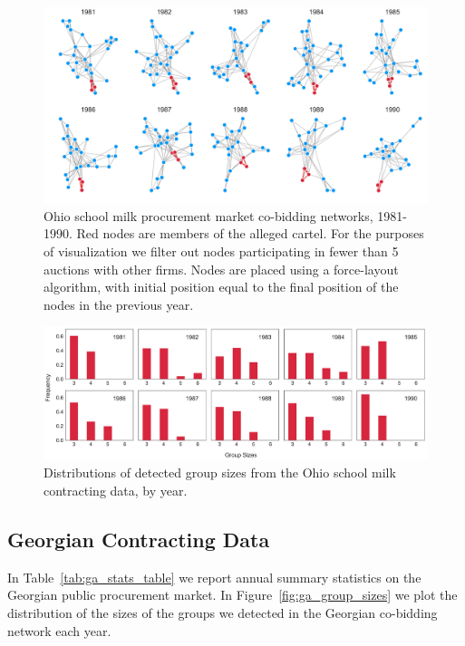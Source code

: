 \begin{figure}
\centering
\includegraphics[width=\textwidth]{images/cartels/ohio_nets.pdf}
\caption[Ohio school milk co-bidding networks by year.]{Ohio school milk procurement market co-bidding networks, 1981-1990. Red nodes are members of the alleged cartel. For the purposes of visualization we filter out nodes participating in fewer than 5 auctions with other firms. Nodes are placed using a force-layout algorithm, with initial position equal to the final position of the nodes in the previous year.}
\label{fig:ohio_nets}
\end{figure}

\begin{figure}
\includegraphics[width=\textwidth]{images/cartels/ohio_group_sizes.pdf}
\caption{Distributions of detected group sizes from the Ohio school milk contracting data, by year.}
\label{fig:oh_group_sizes}
\end{figure}



\subsection{Georgian Contracting Data}
In Table~\ref{tab:ga_stats_table} we report annual summary statistics on the Georgian public procurement market. In Figure~\ref{fig:ga_group_sizes} we plot the distribution of the sizes of the groups we detected in the Georgian co-bidding network each year.

